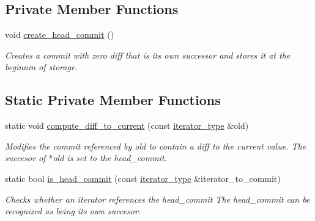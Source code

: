\subsection*{Private Member Functions}
\begin{DoxyCompactItemize}
\item 
void \hyperlink{classarchived_aee0178395c8514fcff373a57b2789793}{create\+\_\+head\+\_\+commit} ()
\begin{DoxyCompactList}\small\item\em Creates a commit with zero diff that is its own successor and stores it at the beginnin of storage. \end{DoxyCompactList}\end{DoxyCompactItemize}
\subsection*{Static Private Member Functions}
\begin{DoxyCompactItemize}
\item 
static void \hyperlink{classarchived_abab0fd2b11101b73dba1ca502e5ac5c0}{compute\+\_\+diff\+\_\+to\+\_\+current} (const \hyperlink{classarchived_ae1e2e3488734f8f0bcd58f5f91f31d52}{iterator\+\_\+type} \&old)
\begin{DoxyCompactList}\small\item\em Modifies the commit referenced by old to contain a diff to the current value. The succesor of $\ast$old is set to the head\+\_\+commit. \end{DoxyCompactList}\item 
static bool \hyperlink{classarchived_aebc07b91c133d50a7f6e398470fd0eec}{is\+\_\+head\+\_\+commit} (const \hyperlink{classarchived_ae1e2e3488734f8f0bcd58f5f91f31d52}{iterator\+\_\+type} \&iterator\+\_\+to\+\_\+commit)
\begin{DoxyCompactList}\small\item\em Checks whether an iterator references the head\+\_\+commit The head\+\_\+commit can be recognized as being its own succesor. \end{DoxyCompactList}\end{DoxyCompactItemize}
